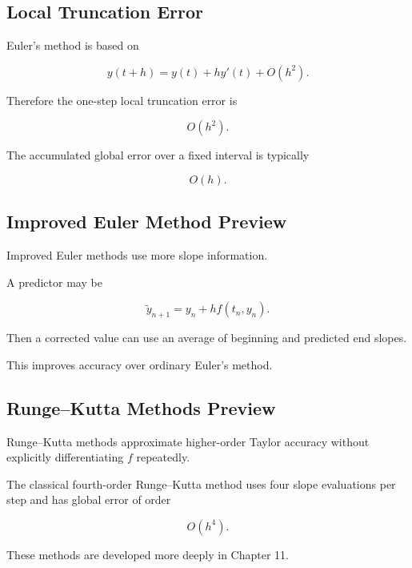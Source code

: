 \subsection{Local Truncation Error}
\label{subsec:euler-local-error}

Euler's method is based on

\[
y(t+h)
=
y(t)
+
hy'(t)
+
O(h^2).
\]

Therefore the one-step local truncation error is

\[
\boxed{
O(h^2).
}
\]

The accumulated global error over a fixed interval is typically

\[
\boxed{
O(h).
}
\]

\subsection{Improved Euler Method Preview}
\label{subsec:improved-euler-preview}

Improved Euler methods use more slope information.

A predictor may be

\[
\widetilde{y}_{n+1}
=
y_n
+
hf(t_n,y_n).
\]

Then a corrected value can use an average of beginning and predicted end
slopes.

This improves accuracy over ordinary Euler's method.

\subsection{Runge--Kutta Methods Preview}
\label{subsec:runge-kutta-preview}

Runge--Kutta methods approximate higher-order Taylor accuracy without
explicitly differentiating \(f\) repeatedly.

The classical fourth-order Runge--Kutta method uses four slope
evaluations per step and has global error of order

\[
\boxed{
O(h^4).
}
\]

These methods are developed more deeply in Chapter 11.


